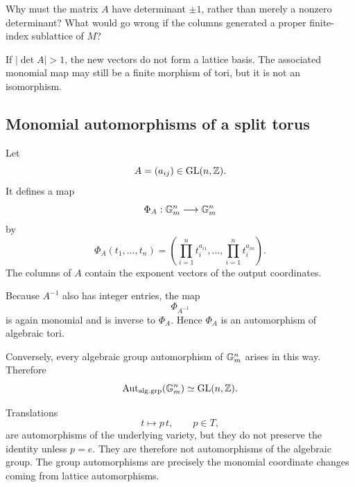 \begin{pauseandthink}
Why must the matrix \(A\) have determinant \(\pm1\), rather than merely
a nonzero determinant? What would go wrong if the columns generated a
proper finite-index sublattice of \(M\)?
\end{pauseandthink}

If \(|\det A|>1\), the new vectors do not form a lattice basis. The
associated monomial map may still be a finite morphism of tori, but it
is not an isomorphism.

\subsection{Monomial automorphisms of a split torus}

Let
\[
A=(a_{ij})\in\operatorname{GL}(n,\mathbb{Z}).
\]
It defines a map
\[
\Phi_A:\mathbb{G}_{m}^n\longrightarrow\mathbb{G}_{m}^n
\]
by
\[
\Phi_A(t_1,\ldots,t_n)
=
\left(
\prod_{i=1}^n t_i^{a_{i1}},
\ldots,
\prod_{i=1}^n t_i^{a_{in}}
\right).
\]
The columns of \(A\) contain the exponent vectors of the output
coordinates.

Because \(A^{-1}\) also has integer entries, the map
\[
\Phi_{A^{-1}}
\]
is again monomial and is inverse to \(\Phi_A\). Hence \(\Phi_A\) is an
automorphism of algebraic tori.

Conversely, every algebraic group automorphism of \(\mathbb{G}_{m}^n\) arises in
this way. Therefore
\[
\operatorname{Aut}_{\mathrm{alg.grp}}(\mathbb{G}_{m}^n)
\simeq
\operatorname{GL}(n,\mathbb{Z}).
\]

\begin{observation}
Translations
\[
t\longmapsto p\,t,
\qquad
p\in T,
\]
are automorphisms of the underlying variety, but they do not preserve
the identity unless \(p=e\). They are therefore not automorphisms of
the algebraic group. The group automorphisms are precisely the
monomial coordinate changes coming from lattice automorphisms.
\end{observation}

